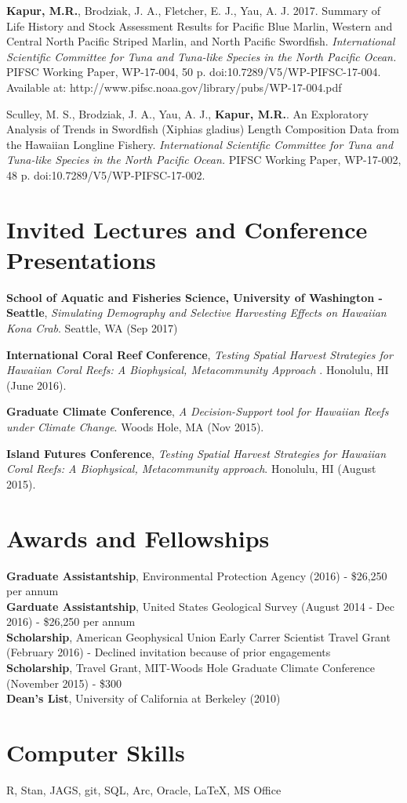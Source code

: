 \documentclass[10pt, letterpaper]{article}
\begin{document}
\hangindent=0.5cm \noindent  \textbf{Kapur, M.R.},  Brodziak, J. A., Fletcher, E. J., Yau, A. J. 2017. Summary of Life History and Stock Assessment Results for Pacific Blue Marlin, Western and Central North Pacific Striped Marlin, and North Pacific Swordfish. \textit{International Scientific Committee for Tuna and Tuna-like Species in the North Pacific Ocean.} PIFSC Working Paper, WP-17-004, 50 p. doi:10.7289/V5/WP-PIFSC-17-004. Available at: http://www.pifsc.noaa.gov/library/pubs/WP-17-004.pdf\newline

\hangindent=0.5cm \noindent  Sculley, M. S., Brodziak, J. A., Yau, A. J., \textbf{Kapur, M.R.}. An Exploratory Analysis of Trends in Swordfish (Xiphias gladius) Length Composition Data from the Hawaiian Longline Fishery. \textit{International Scientific Committee for Tuna and Tuna-like Species in the North Pacific Ocean.} PIFSC Working Paper, WP-17-002, 48 p. doi:10.7289/V5/WP-PIFSC-17-002. \\

\section*{Invited Lectures and Conference Presentations}

\noindent \textbf{School of Aquatic and Fisheries Science, University of Washington - Seattle}, \textit{Simulating Demography and Selective Harvesting Effects on Hawaiian Kona Crab}. Seattle, WA (Sep 2017)

\noindent \textbf{International Coral Reef Conference}, \textit{Testing Spatial Harvest Strategies for Hawaiian Coral Reefs: A Biophysical, Metacommunity Approach }. Honolulu, HI (June 2016).

\noindent \textbf{Graduate Climate Conference}, \textit{A Decision-Support tool for Hawaiian Reefs under Climate Change}. Woods Hole, MA (Nov 2015).

\noindent \textbf{Island Futures Conference}, \textit{Testing Spatial Harvest Strategies for Hawaiian Coral Reefs: A Biophysical, Metacommunity approach}. Honolulu, HI (August 2015).

\section*{Awards and Fellowships}
\textbf{Graduate Assistantship}, Environmental Protection Agency (2016) - \$26,250 per annum \\
\textbf{Garduate Assistantship}, United States Geological Survey (August 2014 - Dec 2016) - \$26,250 per annum \\
\textbf{Scholarship}, American Geophysical Union Early Carrer Scientist Travel Grant (February 2016) - Declined invitation because of prior engagements \\
\textbf{Scholarship}, Travel Grant, MIT-Woods Hole Graduate Climate Conference (November 2015) - \$300 \\
\textbf{Dean's List}, University of California at Berkeley (2010) \\

\section*{Computer Skills}
 R, Stan, JAGS, git, SQL, Arc, Oracle, \LaTeX, MS Office
\end{document}

